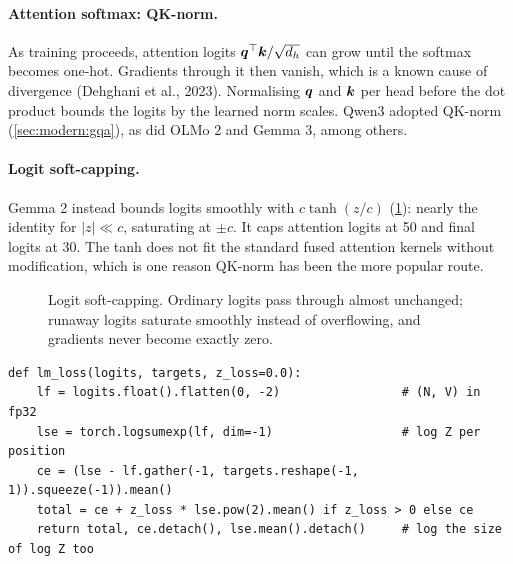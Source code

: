 \paragraph{Attention softmax: QK-norm.} As training proceeds, attention logits $\bm{q}^\top\bm{k}/\sqrt{d_{h}}$
can grow until the softmax becomes one-hot. Gradients through it then vanish, which is a known cause of
divergence (Dehghani et al., 2023). Normalising $\bm{q}$ and $\bm{k}$ per head before the dot product
bounds the logits by the learned norm scales. Qwen3 adopted QK-norm (\cref{sec:modern:gqa}), as did OLMo 2
and Gemma 3, among others.

\paragraph{Logit soft-capping.} Gemma 2 instead bounds logits smoothly with $c\tanh(z/c)$
(\cref{fig:archdesign:softcap}): nearly the identity for $|z|\ll c$, saturating at $\pm c$. It caps
attention logits at 50 and final logits at 30. The tanh does not fit the standard fused attention
kernels without modification, which is one reason QK-norm has been the more popular route.

\begin{figure}[t]
\centering
{}
\caption{Logit soft-capping. Ordinary logits pass through almost unchanged; runaway logits saturate
smoothly instead of overflowing, and gradients never become exactly zero.}
\label{fig:archdesign:softcap}
\end{figure}

\begin{lstlisting}[caption={Cross-entropy with z-loss, computed in fp32 (\texttt{llmsys/ablate.py}).},label={lst:archdesign:zloss}]
def lm_loss(logits, targets, z_loss=0.0):
    lf = logits.float().flatten(0, -2)                 # (N, V) in fp32
    lse = torch.logsumexp(lf, dim=-1)                  # log Z per position
    ce = (lse - lf.gather(-1, targets.reshape(-1, 1)).squeeze(-1)).mean()
    total = ce + z_loss * lse.pow(2).mean() if z_loss > 0 else ce
    return total, ce.detach(), lse.mean().detach()     # log the size of log Z too
\end{lstlisting}

